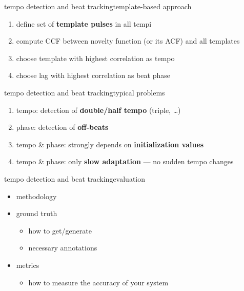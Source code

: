         \begin{frame}{tempo detection and beat tracking}{template-based approach}
            \begin{enumerate}
                \item	define set of \textbf{template pulses} in all tempi
                \item<2->	compute CCF between novelty function (or its ACF) and all templates
                \item<3->	choose template with highest correlation as tempo
                \item<4->	choose lag with highest correlation as beat phase
            \end{enumerate}
        \end{frame}
        \begin{frame}{tempo detection and beat tracking}{typical problems}
            \begin{enumerate}
                \item	tempo: detection of \textbf{double/half tempo} (triple, \ldots)
                \smallskip
                \item<2->	phase: detection of \textbf{off-beats}
                \smallskip
                \item<3->	tempo \& phase: strongly depends on \textbf{initialization values}
                \smallskip
                \item<4->	tempo \& phase: only \textbf{slow adaptation} --- no sudden tempo changes
                
            \end{enumerate}
        \end{frame}
        \begin{frame}{tempo detection and beat tracking}{evaluation}
            \begin{itemize}
                \item   methodology
                \smallskip
                \item   ground truth
                    \begin{itemize}
                        \item   how to get/generate
                        \item   necessary annotations
                    \end{itemize}
                \smallskip
                \item   metrics
                    \begin{itemize}
                        \item   how to measure the accuracy of your system
                    \end{itemize}
            \end{itemize}
        \end{frame}

